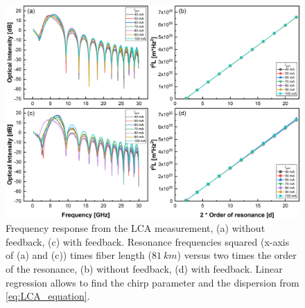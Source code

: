 \begin{figure}[ht]
    \centering
    \includegraphics[width=\linewidth]{figures/chirp_cleaved_and_lensed_4679.png}
    \caption{Frequency response from the LCA measurement, (a) without feedback, (c) with feedback. Resonance frequencies squared (x-axis of (a) and (c)) times fiber length ($81 \ km$) versus two times the order of the resonance, (b) without feedback, (d) with feedback. Linear regression allows to find the chirp parameter and the dispersion from \autoref{eq:LCA_equation}.}
    \label{fig:chirp_cleaved_and_lensed}
\end{figure}

